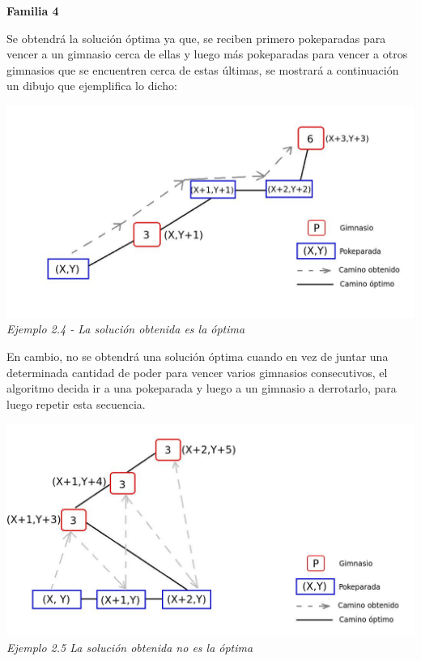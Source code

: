 \begin{center}
\textbf{Familia 4}
\end{center}

Se obtendr\'a la soluci\'on \'optima ya que, se reciben primero pokeparadas para vencer a un gimnasio cerca de ellas y luego m\'as pokeparadas para vencer a otros gimnasios que se encuentren cerca de estas \'ultimas, se mostrar\'a a continuaci\'on un dibujo que ejemplifica lo dicho:

\vspace*{0.3cm} \vspace*{0.3cm}
  \begin{center}
\includegraphics[scale=0.60]{./EJ2/optima.jpeg}
\\{\textit{Ejemplo 2.4 - La soluci\'on obtenida es la \'optima}}
  \end{center}
  \vspace*{0.3cm}

En cambio, no se obtendr\'a una soluci\'on \'optima cuando en vez de juntar una determinada cantidad de poder para vencer varios gimnasios consecutivos, el algoritmo decida ir a una pokeparada y luego a un gimnasio a derrotarlo, para luego repetir esta secuencia.

\vspace*{0.3cm} \vspace*{0.3cm}
  \begin{center}
\includegraphics[scale=0.60]{./EJ2/nooptima.jpeg}
\\{\textit{Ejemplo 2.5 La soluci\'on obtenida no es la \'optima}}
  \end{center}
  \vspace*{0.3cm}
  
